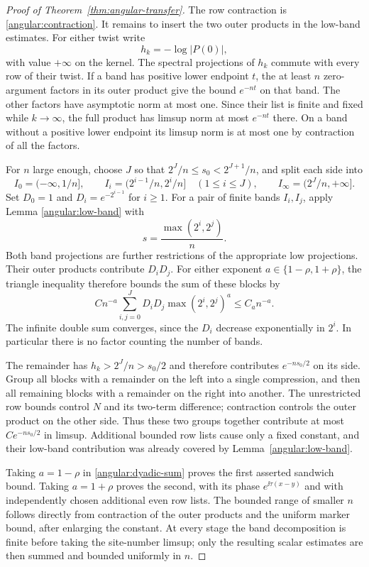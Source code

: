 \begin{proof}[Proof of Theorem~\ref{thm:angular-transfer}]
The row contraction is \eqref{angular:contraction}.  It remains to
insert the two outer products in the low-band estimates.  For either
twist write
\[
 h_k=-\log|P(0)|,
\]
with value $+\infty$ on the kernel.  The spectral projections of $h_k$
commute with every row of their twist.  If a band has positive lower
endpoint $t$, the at least $n$ zero-argument factors in its outer
product give the bound $e^{-nt}$ on that band.  The other factors
have asymptotic norm at most one.  Since their list is finite and
fixed while $k\to\infty$, the full product has limsup norm at most
$e^{-nt}$ there.  On a band without a positive lower endpoint its
limsup norm is at most one by contraction of all the factors.

For $n$ large enough, choose $J$ so that
$2^J/n\le s_0<2^{J+1}/n$, and split each side into
\[
 I_0=(-\infty,1/n],\qquad
 I_i=(2^{i-1}/n,2^i/n]\quad(1\le i\le J),
 \qquad I_\infty=(2^J/n,+\infty].
\]
Set $D_0=1$ and $D_i=e^{-2^{i-1}}$ for $i\ge1$.
For a pair of finite bands $I_i,I_j$, apply Lemma
\ref{angular:low-band} with
\[
 s=\frac{\max(2^i,2^j)}n.
\]
Both band projections are further restrictions of the appropriate
low projections.  Their outer products contribute $D_iD_j$.
For either exponent $a\in\{1-\rho,1+\rho\}$, the triangle inequality
therefore bounds the sum of these blocks by
\begin{equation}\label{angular:dyadic-sum}
 C n^{-a}\sum_{i,j=0}^{J}
 D_iD_j\max(2^i,2^j)^a
 \le C_a n^{-a}.
\end{equation}
The infinite double sum converges, since the $D_i$ decrease
exponentially in $2^i$.  In particular there is no factor counting
the number of bands.

The remainder has $h_k>2^J/n>s_0/2$ and therefore contributes
$e^{-ns_0/2}$ on its side.  Group all blocks with a remainder on the
left into a single compression, and then all remaining blocks with
a remainder on the right into another.  The unrestricted row bounds
control $N$ and its two-term difference; contraction controls the
outer product on the other side.  Thus these two groups together
contribute at most $Ce^{-ns_0/2}$ in limsup.  Additional bounded row
lists cause only a fixed constant, and their low-band contribution
was already covered by Lemma~\ref{angular:low-band}.

Taking $a=1-\rho$ in \eqref{angular:dyadic-sum} proves the first
asserted sandwich bound.  Taking $a=1+\rho$ proves the second, with
its phase $e^{\ii\tau(x-y)}$ and with independently chosen additional
even row lists.  The bounded range of smaller $n$ follows directly
from contraction of the outer products and the uniform marker bound,
after enlarging the constant.  At every stage
the band decomposition is finite before taking the site-number
limsup; only the resulting scalar estimates are then summed and
bounded uniformly in $n$.
\end{proof}
